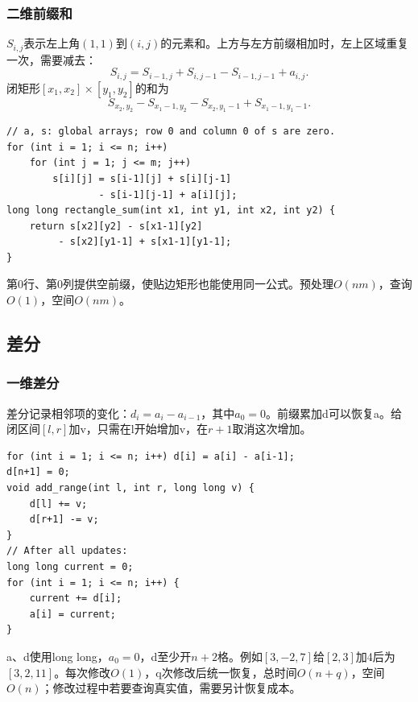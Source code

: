 \documentclass[UTF8,11pt,a4paper,fontset=none]{ctexart}
\begin{document}
\subsubsection{二维前缀和}
$S_{i,j}$表示左上角$(1,1)$到$(i,j)$的元素和。上方与左方前缀相加时，左上区域重复一次，需要减去：
\[
S_{i,j}=S_{i-1,j}+S_{i,j-1}-S_{i-1,j-1}+a_{i,j}.
\]
闭矩形$[x_1,x_2]\times[y_1,y_2]$的和为
\[
S_{x_2,y_2}-S_{x_1-1,y_2}-S_{x_2,y_1-1}+S_{x_1-1,y_1-1}.
\]
\par\noindent\begin{minipage}{\linewidth}
\begin{lstlisting}
// a, s: global arrays; row 0 and column 0 of s are zero.
for (int i = 1; i <= n; i++)
    for (int j = 1; j <= m; j++)
        s[i][j] = s[i-1][j] + s[i][j-1]
                - s[i-1][j-1] + a[i][j];
long long rectangle_sum(int x1, int y1, int x2, int y2) {
    return s[x2][y2] - s[x1-1][y2]
         - s[x2][y1-1] + s[x1-1][y1-1];
}
\end{lstlisting}
\end{minipage}\par
第0行、第0列提供空前缀，使贴边矩形也能使用同一公式。预处理$O(nm)$，查询$O(1)$，空间$O(nm)$。
\subsection{差分}
\subsubsection{一维差分}
差分记录相邻项的变化：$d_i=a_i-a_{i-1}$，其中$a_0=0$。前缀累加d可以恢复a。给闭区间$[l,r]$加v，只需在l开始增加v，在$r+1$取消这次增加。
\par\noindent\begin{minipage}{\linewidth}
\begin{lstlisting}
for (int i = 1; i <= n; i++) d[i] = a[i] - a[i-1];
d[n+1] = 0;
void add_range(int l, int r, long long v) {
    d[l] += v;
    d[r+1] -= v;
}
// After all updates:
long long current = 0;
for (int i = 1; i <= n; i++) {
    current += d[i];
    a[i] = current;
}
\end{lstlisting}
\end{minipage}\par
a、d使用long long，$a_0=0$，d至少开$n+2$格。例如$[3,-2,7]$给$[2,3]$加4后为$[3,2,11]$。每次修改$O(1)$，q次修改后统一恢复，总时间$O(n+q)$，空间$O(n)$；修改过程中若要查询真实值，需要另计恢复成本。
\end{document}
